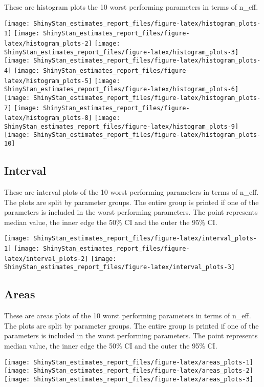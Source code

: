 \documentclass[11pt,]{article}
\begin{document}
These are histogram plots the 10 worst performing parameters in terms of
n\_eff.

\texttt{[image: ShinyStan\_estimates\_report\_files/figure-latex/histogram\_plots-1]}
\texttt{[image: ShinyStan\_estimates\_report\_files/figure-latex/histogram\_plots-2]}
\texttt{[image: ShinyStan\_estimates\_report\_files/figure-latex/histogram\_plots-3]}
\texttt{[image: ShinyStan\_estimates\_report\_files/figure-latex/histogram\_plots-4]}
\texttt{[image: ShinyStan\_estimates\_report\_files/figure-latex/histogram\_plots-5]}
\texttt{[image: ShinyStan\_estimates\_report\_files/figure-latex/histogram\_plots-6]}
\texttt{[image: ShinyStan\_estimates\_report\_files/figure-latex/histogram\_plots-7]}
\texttt{[image: ShinyStan\_estimates\_report\_files/figure-latex/histogram\_plots-8]}
\texttt{[image: ShinyStan\_estimates\_report\_files/figure-latex/histogram\_plots-9]}
\texttt{[image: ShinyStan\_estimates\_report\_files/figure-latex/histogram\_plots-10]}

\newpage

\hypertarget{interval}{%
\subsection{Interval}\label{interval}}

These are interval plots of the 10 worst performing parameters in terms
of n\_eff. The plots are split by parameter groups. The entire group is
printed if one of the parameters is included in the worst performing
parameters. The point represents median value, the inner edge the 50\%
CI and the outer the 95\% CI.

\texttt{[image: ShinyStan\_estimates\_report\_files/figure-latex/interval\_plots-1]}
\texttt{[image: ShinyStan\_estimates\_report\_files/figure-latex/interval\_plots-2]}
\texttt{[image: ShinyStan\_estimates\_report\_files/figure-latex/interval\_plots-3]}

\newpage

\hypertarget{areas}{%
\subsection{Areas}\label{areas}}

These are areas plots of the 10 worst performing parameters in terms of
n\_eff. The plots are split by parameter groups. The entire group is
printed if one of the parameters is included in the worst performing
parameters. The point represents median value, the inner edge the 50\%
CI and the outer the 95\% CI.

\texttt{[image: ShinyStan\_estimates\_report\_files/figure-latex/areas\_plots-1]}
\texttt{[image: ShinyStan\_estimates\_report\_files/figure-latex/areas\_plots-2]}
\texttt{[image: ShinyStan\_estimates\_report\_files/figure-latex/areas\_plots-3]}
\end{document}
